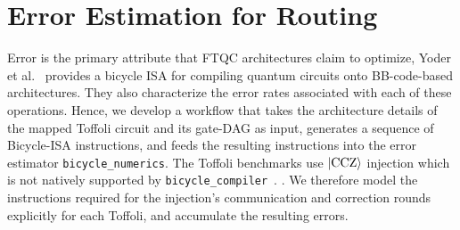 \documentclass[sigconf]{acmart}
\begin{document}
\section{Error Estimation for Routing}
\label{sec:2}
Error is the primary attribute that FTQC architectures claim to optimize, Yoder et al.~\cite[Table 2]{tourdegross} provides a bicycle ISA for compiling quantum circuits onto BB-code-based architectures. They also characterize the error rates associated with each of these operations. Hence, we develop a workflow that takes the architecture details of the mapped Toffoli circuit and its gate-DAG as input, generates a sequence of Bicycle-ISA instructions, and feeds the resulting instructions into the error estimator \texttt{bicycle\_numerics}. The Toffoli benchmarks use $\ket{\mathrm{CCZ}}$ injection  which is not natively supported by \texttt{bicycle\_compiler}~\cite{bicycle_compiler}.
. We therefore model the instructions required for the injection's communication and correction rounds explicitly for each Toffoli, and accumulate the resulting errors.



\end{document}
